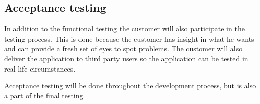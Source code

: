 \subsection{Acceptance testing}
In addition to the functional testing the customer will also participate in the testing process. This is done because the customer has insight in what he wants and can provide a fresh set of eyes to spot problems. The customer will also deliver the application to third party users so the application can be tested in real life circumstances.

Acceptance testing will be done throughout the development process, but is also a part of the final testing.
